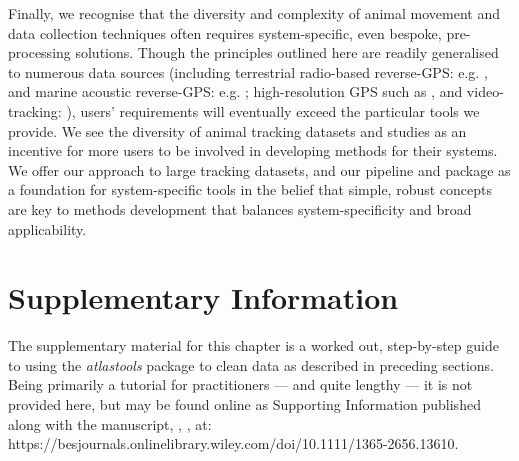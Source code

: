     Finally, we recognise that the diversity and complexity of animal movement and data collection techniques often requires system-specific, even bespoke, pre-processing solutions.
    Though the principles outlined here are readily generalised to numerous data sources (including terrestrial radio-based reverse-GPS: e.g. \citealt{toledo2020}, and marine acoustic reverse-GPS: e.g. \citealt{aspillaga2021}; high-resolution GPS such as \citealt{strandburg-peshkin2015}, and video-tracking: \citealt{rathore2020}), users' requirements will eventually exceed the particular tools we provide.
    We see the diversity of animal tracking datasets and studies as an incentive for more users to be involved in developing methods for their systems.
    We offer our approach to large tracking datasets, and our pipeline and package as a foundation for system-specific tools in the belief that simple, robust concepts are key to methods development that balances system-specificity and broad applicability.

    { \begin{center}  \end{center} }


    \begingroup

    \let\clearpage\relax
    \let\cleardoublepage\relax
    \let\cleardoublepage\relax

    {\chapter*{Supplementary Information}}

    The supplementary material for this chapter is a worked out, step-by-step guide to using the \emph{atlastools} package to clean data as described in preceding sections.
    Being primarily a tutorial for practitioners --- and quite lengthy --- it is not provided here, but may be found online as Supporting Information published along with the manuscript, \textcite{gupte2022d}, , at:
    https://besjournals.onlinelibrary.wiley.com/doi/10.1111/1365-2656.13610.

    { \begin{center}  \end{center} }

    \endgroup

